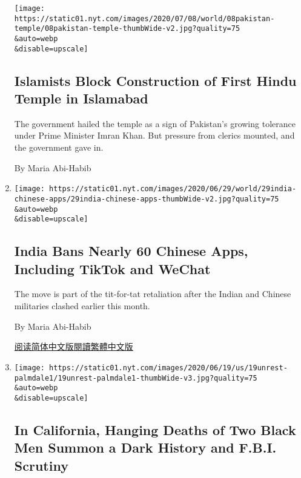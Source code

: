 \begin{enumerate}
  \texttt{[image: https://static01.nyt.com/images/2020/07/08/world/08pakistan-temple/08pakistan-temple-thumbWide-v2.jpg?quality=75\\\&auto=webp\\\&disable=upscale]}

  \hypertarget{islamists-block-construction-of-first-hindu-temple-in-islamabad}{%
  \subsection{Islamists Block Construction of First Hindu Temple in
  Islamabad}\label{islamists-block-construction-of-first-hindu-temple-in-islamabad}}

  The government hailed the temple as a sign of Pakistan's growing
  tolerance under Prime Minister Imran Khan. But pressure from clerics
  mounted, and the government gave in.

  By Maria Abi-Habib
\item
  \href{/2020/06/29/world/asia/tik-tok-banned-india-china.html}{}

  \texttt{[image: https://static01.nyt.com/images/2020/06/29/world/29india-chinese-apps/29india-chinese-apps-thumbWide-v2.jpg?quality=75\\\&auto=webp\\\&disable=upscale]}

  \hypertarget{india-bans-nearly-60-chinese-apps-including-tiktok-and-wechat}{%
  \subsection{India Bans Nearly 60 Chinese Apps, Including TikTok and
  WeChat}\label{india-bans-nearly-60-chinese-apps-including-tiktok-and-wechat}}

  The move is part of the tit-for-tat retaliation after the Indian and
  Chinese militaries clashed earlier this month.

  By Maria Abi-Habib

  \href{https://cn.nytimes.com/world/20200630/tik-tok-banned-india-china/}{阅读简体中文版}\href{https://cn.nytimes.com/world/20200630/tik-tok-banned-india-china/zh-hant/}{閱讀繁體中文版}
\item
  \href{/2020/06/19/us/hanging-deaths-california.html}{}

  \texttt{[image: https://static01.nyt.com/images/2020/06/19/us/19unrest-palmdale1/19unrest-palmdale1-thumbWide-v3.jpg?quality=75\\\&auto=webp\\\&disable=upscale]}

  \hypertarget{in-california-hanging-deaths-of-two-black-men-summon-a-dark-history-and-fbi-scrutiny}{%
  \subsection{In California, Hanging Deaths of Two Black Men Summon a
  Dark History and F.B.I.
  Scrutiny}\label{in-california-hanging-deaths-of-two-black-men-summon-a-dark-history-and-fbi-scrutiny}}


\end{enumerate}
